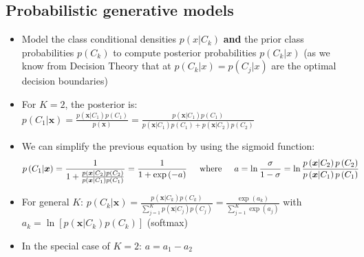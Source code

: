 \subsection{Probabilistic generative models}
\begin{itemize}
	\item Model the class conditional densities $p\left(x|C_k\right)$ \textbf{and} the prior class probabilities $p(C_k)$ to compute posterior probabilities $p\left(C_k|x\right)$ (as we know from Decision Theory that at $p\left(C_k|x\right)=p\left(C_j|x\right)$ are the optimal decision boundaries)
	\item For $K=2$, the posterior is: $p\left(C_1|\bm{x}\right) = \frac{p\left(\bm{x}|C_1\right)p\left(C_1\right)}{p\left(\bm{x}\right)} = \frac{p\left(\bm{x}|C_1\right)p\left(C_1\right)}{p\left(\bm{x}|C_1\right)p\left(C_1\right) + p\left(\bm{x}|C_2\right)p\left(C_2\right)}$
	\item We can simplify the previous equation by using the sigmoid function:
	\begin{equation*}
		\begin{split}
			p\left(C_1|\bm{x}\right) & = \frac{1}{1 + \frac{p\left(\bm{x}|C_2\right)p\left(C_2\right)}{p\left(\bm{x}|C_1\right)p\left(C_1\right)} } = \frac{1}{1+\exp\left(-a\right)} \text{\hspace{5mm}where\hspace{5mm}} a=\ln\frac{\sigma}{1-\sigma} = \ln \frac{p\left(\bm{x}|C_2\right)p\left(C_2\right)}{p\left(\bm{x}|C_1\right)p\left(C_1\right)}
		\end{split}
	\end{equation*}
	\item For general $K$: $p\left(C_k|\bm{x}\right) = \frac{p\left(\bm{x}|C_k\right)p\left(C_k\right)}{\sum_{j=1}^{K}p\left(\bm{x}|C_j\right)p\left(C_j\right)} = \frac{\exp(a_k)}{\sum_{j=1}^{K} \exp(a_j)}$ with $a_k = \ln \left[ p\left(\bm{x}|C_k\right)p\left(C_k\right)\right]$ (softmax)
	\item In the special case of $K=2$: $a=a_1-a_2$
\end{itemize}
